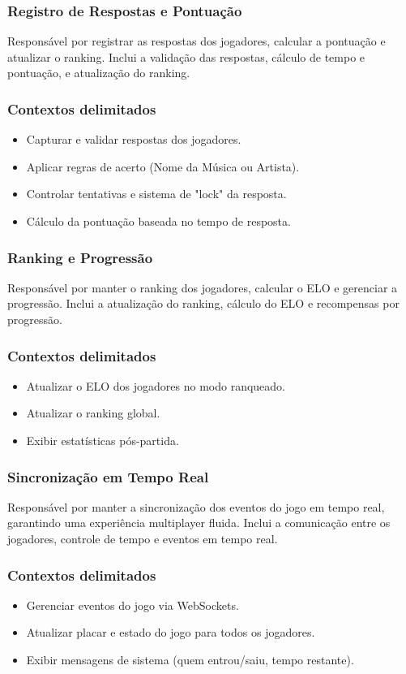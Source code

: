     \subsubsection{Registro de Respostas e Pontuação}
        Responsável por registrar as respostas dos jogadores, calcular a pontuação e atualizar o ranking. Inclui a validação das respostas, cálculo de tempo e pontuação, e atualização do ranking.
        \subsubsection{Contextos delimitados}
        \begin{itemize}
            \item Capturar e validar respostas dos jogadores.
            \item Aplicar regras de acerto (Nome da Música ou Artista).
            \item Controlar tentativas e sistema de "lock" da resposta.
            \item Cálculo da pontuação baseada no tempo de resposta.
        \end{itemize}
    
    \subsubsection{Ranking e Progressão}
        Responsável por manter o ranking dos jogadores, calcular o ELO e gerenciar a progressão. Inclui a atualização do ranking, cálculo do ELO e recompensas por progressão.
        \subsubsection{Contextos delimitados}
        \begin{itemize}
            \item Atualizar o ELO dos jogadores no modo ranqueado.
            \item Atualizar o ranking global.
            \item Exibir estatísticas pós-partida.
        \end{itemize}
    
    \subsubsection{Sincronização em Tempo Real}
        Responsável por manter a sincronização dos eventos do jogo em tempo real, garantindo uma experiência multiplayer fluida. Inclui a comunicação entre os jogadores, controle de tempo e eventos em tempo real.
        \subsubsection{Contextos delimitados}
        \begin{itemize}
            \item Gerenciar eventos do jogo via WebSockets.
            \item Atualizar placar e estado do jogo para todos os jogadores.
            \item Exibir mensagens de sistema (quem entrou/saiu, tempo restante).
        \end{itemize}